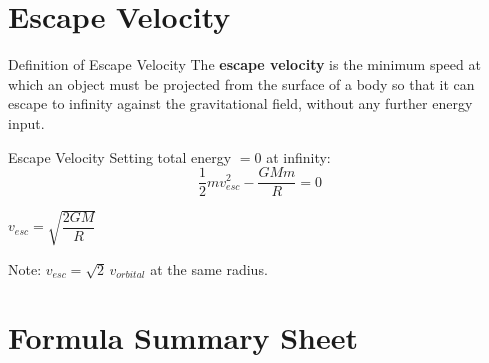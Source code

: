 \section{Escape Velocity}

\begin{definitionbox}{Definition of Escape Velocity}
The \textbf{escape velocity} is the minimum speed at which an object must be projected from the surface of a body so that it can escape to infinity against the gravitational field, without any further energy input.
\end{definitionbox}

\begin{formulabox}{Escape Velocity}
Setting total energy $= 0$ at infinity:
$$\frac{1}{2}mv_{esc}^2 - \frac{GMm}{R} = 0$$
\begin{center}
\Large $v_{esc} = \sqrt{\dfrac{2GM}{R}}$
\end{center}
\vspace{0.3em}
Note: $v_{esc} = \sqrt{2}\, v_{orbital}$ at the same radius.
\end{formulabox}

\section{Formula Summary Sheet}

